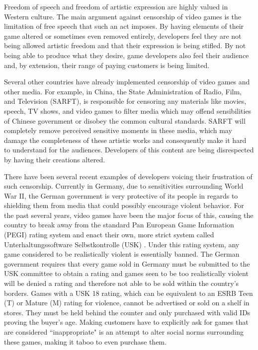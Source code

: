 Freedom of speech and freedom of artistic expression are highly valued in Western culture. The main argument against censorship of video games is the limitation of free speech that such an act imposes. By having elements of their game altered or sometimes even removed entirely, developers feel they are not being allowed artistic freedom and that their expression is being stifled. By not being able to produce what they desire, game developers also feel their audience and, by extension, their range of paying customers is being limited. 

Several other countries have already implemented censorship of video games and other media. For example, in China, the State Administration of Radio, Film, and Television (SARFT), is responsible for censoring any materials like movies, speech, TV shows, and video games to filter media which may offend sensibilities of Chinese government or disobey the common cultural standards. SARFT will completely remove perceived sensitive moments in these media, which may damage the completeness of these artistic works and consequently make it hard to understand for the audiences. Developers of this content are being disrespected by having their creations altered.

There have been several recent examples of developers voicing their frustration of such censorship. Currently in Germany, due to sensitivities surrounding World War II, the German government is very protective of its people in regards to shielding them from media that could possibly encourage violent behavior. For the past several years, video games have been the major focus of this, causing the country to break away from the standard Pan European Game Information (PEGI) rating system \cite{pegi} and enact their own, more strict system called Unterhaltungssoftware Selbstkontrolle (USK) \cite{usk}. Under this rating system, any game considered to be realistically violent is essentially banned. The German government requires that every game sold in Germany must be submitted to the USK committee to obtain a rating and games seen to be too realistically violent will be denied a rating and therefore not able to be sold within the country's borders. Games with a USK 18 rating, which can be equivalent to an ESRB Teen (T) or Mature (M) rating for violence, cannot be advertised or sold on a shelf in stores. They must be held behind the counter and only purchased with valid IDs proving the buyer's age. Making customers have to explicitly ask for games that are considered ``inappropriate" is an attempt to alter social norms surrounding these games, making it taboo to even purchase them.

